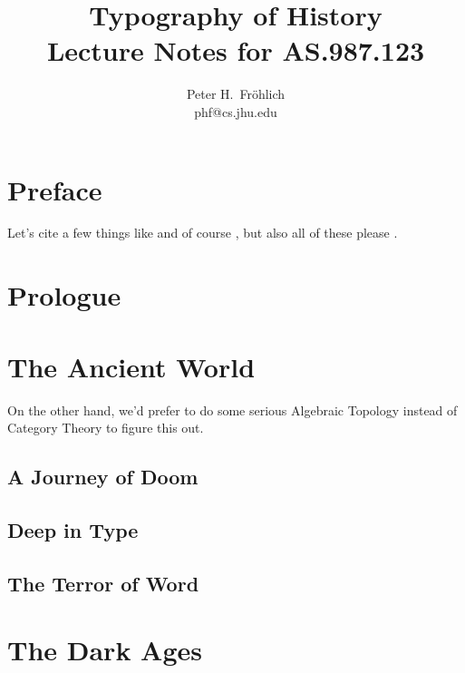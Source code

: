 \documentclass[11pt]{book}
\title{\textbf{Typography of History}\\
Lecture Notes for AS.987.123}
\author{Peter H.\ Fr{\"o}hlich\\
phf@cs.jhu.edu}
\begin{document}
\frontmatter

\maketitle

\chapter*{Preface}

\lipsum[1]

Let's cite a few things like \cite{kant02} and of
course \cite{lamport94}, but also all of these
please \cite{Conway2000,Meyer2000,Huetal2000,LaTeXe,lshort,Gill}.
\lipsum[3-4]

\tableofcontents
\listoffigures
\listoftables

\mainmatter

\chapter{Prologue}
\lipsum[1-10]

\chapter{The Ancient World}
\lipsum[2]

On the other hand, we'd prefer to do some
serious Algebraic Topology
instead of Category Theory to figure this out.

\section{A Journey of Doom}
\lipsum[1-4]

\section{Deep in Type}
\lipsum[7-10]

\section{The Terror of Word}
\lipsum[4-5]

\chapter{The Dark Ages}
\lipsum[1-10]
\end{document}

